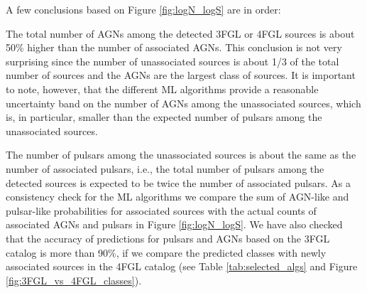 A few conclusions based on Figure \ref{fig:logN_logS} are in order:
\ben
\item
The total number of AGNs among the detected 3FGL or 4FGL sources is about 50\% higher than the number of associated AGNs.
This conclusion is not very surprising since the number of unassociated sources is about 1/3 of the total number of sources and the 
AGNs are the largest class of sources. It is important to note, however, that the different ML algorithms provide a reasonable uncertainty band on the number of AGNs among the unassociated sources, which is, in particular, smaller than the expected number of pulsars among the unassociated sources.
\item
The number of pulsars among the unassociated sources is about the same as the number of associated pulsars, i.e., the total number of pulsars among the detected sources is expected to be twice the number of associated pulsars.
\een
As a consistency check for the ML algorithms we compare the sum of AGN-like and pulsar-like probabilities for associated sources with the actual counts of associated AGNs and pulsars in Figure \ref{fig:logN_logS}. We have also checked that the accuracy of predictions for pulsars and AGNs based on the 3FGL catalog is more than 90\%, if we compare the predicted classes with newly associated sources in the 4FGL catalog (see Table \ref{tab:selected_algs} and Figure \ref{fig:3FGL_vs_4FGL_classes}).





